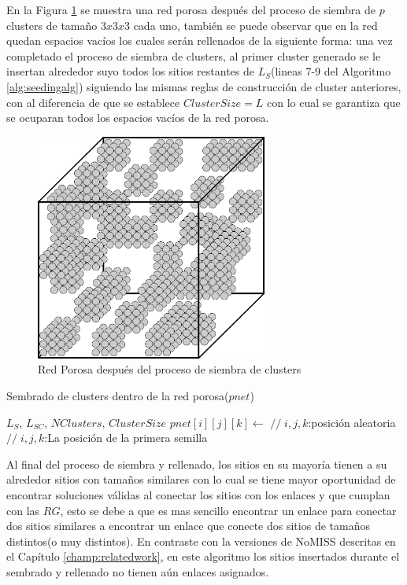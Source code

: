 En la Figura \ref{fig:cluster1} se muestra una red porosa después del proceso de siembra de $p$ clusters de tamaño $3x3x3$ cada uno, también se puede observar que en la red quedan espacios vacíos  los cuales serán rellenados de la siguiente forma: una vez completado el proceso de siembra de clusters, al primer cluster generado se le insertan alrededor suyo todos los sitios restantes de $L_S$(lineas 7-9 del Algoritmo \ref{alg:seedingalg}) siguiendo las mismas reglas de construcción de cluster anteriores, con al diferencia de que se establece $ClusterSize=L$ con lo cual se garantiza que se ocuparan todos los espacios vacíos de la red porosa.\\

\begin{figure}[h]
\centering
\includegraphics[width=3.0in]{img/cluster1.pdf}
\caption{Red Porosa después del proceso de siembra de clusters}
\label{fig:cluster1}
\end{figure}

\begin{algorithm}
\caption{Sembrado de clusters dentro de la red porosa($pnet$)}\label{alg:seedingalg}
\begin{algorithmic}[1]
\Require $L_S$, $L_{SC}$, $NClusters$, $ClusterSize$ 
\State $pnet[i][j][k] \gets $  {$//\;i,j,k$:posición aleatoria}
\State {}
\EndFor
\EndFor
{} {$//\;i,j,k$:La posición de la primera semilla}
	\State {}
\EndWhile
\end{algorithmic}
\end{algorithm}

Al final del proceso de siembra y rellenado, los sitios en su mayoría tienen a su alrededor sitios con tamaños similares con lo cual se tiene mayor oportunidad de encontrar soluciones válidas al conectar los sitios con los enlaces y que cumplan con las $RG$, esto se debe a que es mas sencillo encontrar un enlace para conectar dos sitios similares a encontrar un enlace que conecte dos sitios de tamaños distintos(o muy distintos). En contraste con la versiones de NoMISS descritas en el Capítulo \ref{champ:relatedwork}, en este algoritmo los sitios insertados durante el sembrado y rellenado no tienen aún enlaces asignados.\\

